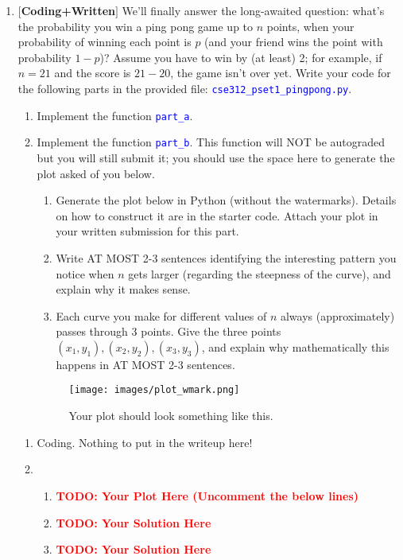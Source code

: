 \documentclass[12pt]{article}
\def\code#1{\textcolor{blue}{\texttt{#1}}}
\def\todo#1{\textcolor{red}{\textbf{#1}}}
\renewcommand{\|}{\mid}
\begin{document}
\begin{enumerate}
\item \textbf{$[$Coding+Written$]$} We'll finally answer the long-awaited question: what's the probability you win a ping pong game up to $n$ points, when your probability of winning each point is $p$ (and your friend wins the point with probability $1-p$)? Assume you have to win by (at least) 2; for example, if $n=21$ and the score is $21-20$, the game isn't over yet.
Write your code for the following parts in the provided file: \code{cse312\_pset1\_pingpong.py}.
\begin{enumerate}
    \item Implement the function \code{part\_a}.
    \item Implement the function \code{part\_b}. This function will NOT be autograded but you will still submit it; you should use the space here to generate the plot asked of you below. 
    \begin{enumerate}
        \item Generate the plot below in Python (without the watermarks). Details on how to construct it are in the starter code. Attach your plot in your written submission for this part.
        \item Write AT MOST 2-3 sentences identifying the interesting pattern you notice when $n$ gets larger (regarding the steepness of the curve), and explain why it makes sense.
        \item Each curve you make for different values of $n$ always (approximately) passes through 3 points. Give the three points $(x_1,y_1),(x_2,y_2),(x_3,y_3)$, and explain why mathematically this happens in AT MOST 2-3 sentences.
    \end{enumerate}
    \begin{figure}[h]
\caption{Your plot should look something like this.}
\centering
\texttt{[image: images/plot\_wmark.png]}
\end{figure}
\end{enumerate}

\begin{tcolorbox}
\begin{enumerate}
\item Coding. Nothing to put in the writeup here!
\item 
\begin{enumerate}[label=\roman*.]
\item \todo{TODO: Your Plot Here (Uncomment the below lines)} 
\item \todo{TODO: Your Solution Here}
\item \todo{TODO: Your Solution Here}
\end{enumerate}
\end{enumerate}
\end{tcolorbox}



\end{enumerate}
\end{document}
